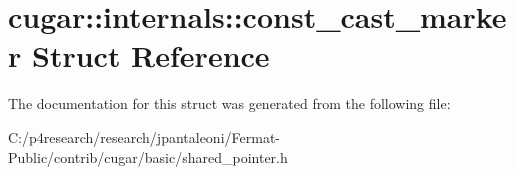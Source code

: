 \hypertarget{structcugar_1_1internals_1_1const__cast__marker}{}\section{cugar\+:\+:internals\+:\+:const\+\_\+cast\+\_\+marker Struct Reference}
\label{structcugar_1_1internals_1_1const__cast__marker}


The documentation for this struct was generated from the following file\+:\begin{DoxyCompactItemize}
\item 
C\+:/p4research/research/jpantaleoni/\+Fermat-\/\+Public/contrib/cugar/basic/shared\+\_\+pointer.\+h\end{DoxyCompactItemize}
